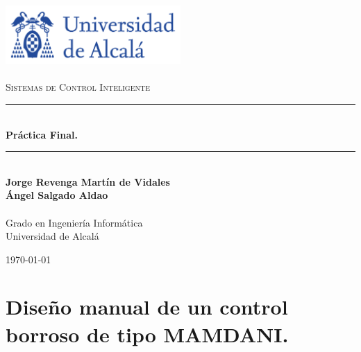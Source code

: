 \documentclass[a4paper, 12pt]{article}
\newcommand{\HRule}{\rule{\linewidth}{0.5mm}}
\begin{document}
    \begin{titlepage}
        \begin{center}
            \includegraphics[width=0.5\textwidth]{figures/logoUAH.png}~\\[2cm]
            
            \textsc{\Large \\Sistemas de Control Inteligente}\\[2cm]
            
            \HRule \\[0.4cm]
            {\LARGE \bfseries Práctica Final.  \\[0.4cm]}
            \HRule \\[3cm]
            
            \large\textbf{Jorge Revenga Martín de Vidales}\\
            \large\textbf{Ángel Salgado Aldao}\\
            \large\textbf{}\\ Grado en Ingeniería Informática \\ Universidad de Alcalá
            
            \vfill
            
            {\large \today}
        \end{center}
    \end{titlepage}

    \pagestyle{fancy}
    \fancyhf{} %
    \fancyfoot[RO,LE]{\thepage}  %
    \newpage
    
    \thispagestyle{plain}
    \tableofcontents
    \newpage

    \part{Diseño manual de un control borroso de tipo MAMDANI.}
    
\end{document}

